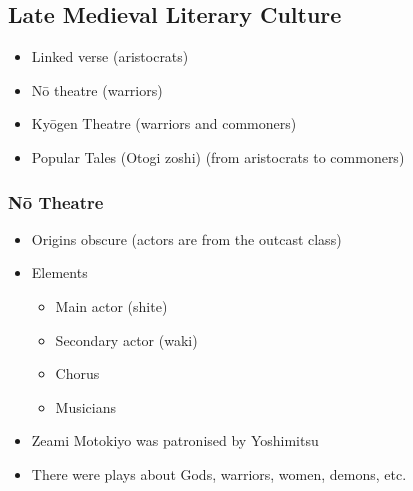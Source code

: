 \documentclass[class=article, crop=false]{standalone}
\begin{document}
  \subsection{Late Medieval Literary Culture}
  \begin{itemize}
    \item Linked verse (aristocrats)
    \item N\=o theatre (warriors)
    \item Ky\=ogen Theatre (warriors and commoners)
    \item Popular Tales (Otogi zoshi) (from aristocrats to commoners)
  \end{itemize}
  \subsubsection{N\=o Theatre}
  \begin{itemize}
    \item Origins obscure (actors are from the outcast class)
    \item Elements
    \begin{itemize}
      \item Main actor (shite)
      \item Secondary actor (waki)
      \item Chorus
      \item Musicians
    \end{itemize}
    \item Zeami Motokiyo was patronised by Yoshimitsu
    \item There were plays about Gods, warriors, women, demons, etc.
  \end{itemize}
\end{document}
